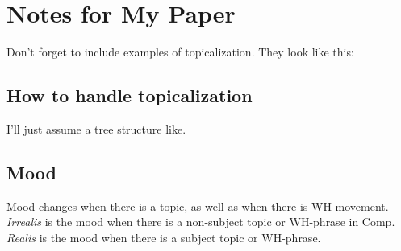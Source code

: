 \documentclass[12pt]{article}
\begin{document}
\section*{Notes for My Paper}

Don't forget to include examples of topicalization.
They look like this:


\subsection*{How to handle topicalization}

I'll just assume a tree structure like.

\subsection*{Mood}

Mood changes when there is a topic, as well as when
there is WH-movement.  \emph{Irrealis} is the mood when
there is a non-subject topic or WH-phrase in Comp.
\emph{Realis} is the mood when there is a subject topic
or WH-phrase.
\end{document}
